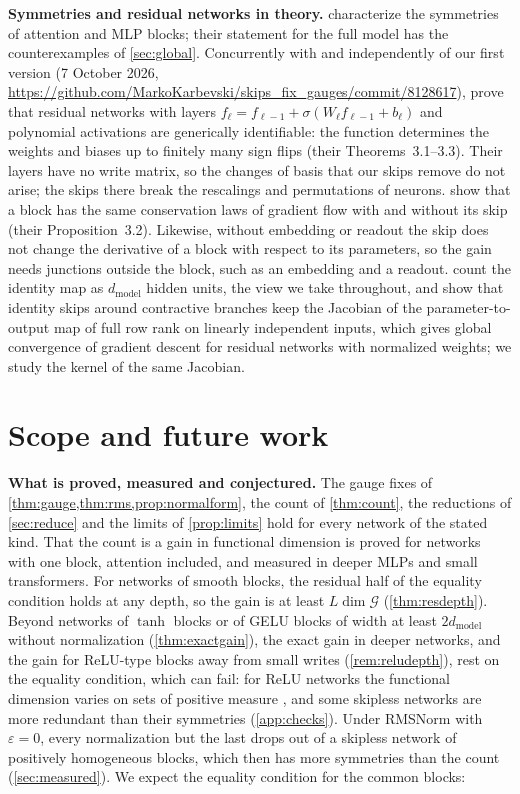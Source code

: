 \documentclass[10pt]{article}
\theoremstyle{definition}
\theoremstyle{remark}
\newcommand{\dm}{d_{\mathrm{model}}}
\newcommand{\G}{\mathcal{G}}
\newcommand{\para}[1]{\smallskip\noindent\textbf{#1}\hspace{0.5em}}
\newif\ifanon \anonfalse
\begin{document}
\para{Symmetries and residual networks in theory.} \citet{wang2025gauge} characterize the symmetries of attention and MLP blocks; their statement for the full model has the counterexamples of \cref{sec:global}. \ifanon Concurrently,\else Concurrently with and independently of our first version (7 October 2026, \url{https://github.com/MarkoKarbevski/skips_fix_gauges/commit/8128617}),\fi{} \citet{dahlgren2026polynomial} prove that residual networks with layers $f_\ell = f_{\ell-1} + \sigma(W_\ell f_{\ell-1} + b_\ell)$ and polynomial activations are generically identifiable: the function determines the weights and biases up to finitely many sign flips (their Theorems~3.1--3.3). Their layers have no write matrix, so the changes of basis that our skips remove do not arise; the skips there break the rescalings and permutations of neurons. \citet{marcotte2025resnets} show that a block has the same conservation laws of gradient flow with and without its skip (their Proposition~3.2). Likewise, without embedding or readout the skip does not change the derivative of a block with respect to its parameters, so the gain needs junctions outside the block, such as an embedding and a readout. \citet{lin2018resnet} count the identity map as $\dm$ hidden units, the view we take throughout, and \citet{macdonald2023skip} show that identity skips around contractive branches keep the Jacobian of the parameter-to-output map of full row rank on linearly independent inputs, which gives global convergence of gradient descent for residual networks with normalized weights; we study the kernel of the same Jacobian.

\section{Scope and future work}\label{sec:outlook}

\para{What is proved, measured and conjectured.} The gauge fixes of \cref{thm:gauge,thm:rms,prop:normalform}, the count of \cref{thm:count}, the reductions of \cref{sec:reduce} and the limits of \cref{prop:limits} hold for every network of the stated kind. That the count is a gain in functional dimension is proved for networks with one block, attention included, and measured in deeper MLPs and small transformers. For networks of smooth blocks, the residual half of the equality condition holds at any depth, so the gain is at least $L\dim\G$ (\cref{thm:resdepth}). Beyond networks of $\tanh$ blocks or of GELU blocks of width at least $2\dm$ without normalization (\cref{thm:exactgain}), the exact gain in deeper networks, and the gain for ReLU-type blocks away from small writes (\cref{rem:reludepth}), rest on the equality condition, which can fail: for ReLU networks the functional dimension varies on sets of positive measure \citep{grigsby2023hidden}, and some skipless networks are more redundant than their symmetries (\cref{app:checks}). Under RMSNorm with $\varepsilon = 0$, every normalization but the last drops out of a skipless network of positively homogeneous blocks, which then has more symmetries than the count (\cref{sec:measured}). We expect the equality condition for the common blocks:
\end{document}
